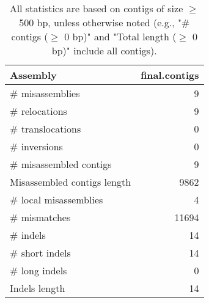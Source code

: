 \documentclass[12pt,a4paper]{article}
\begin{document}
\begin{table}[ht]
\begin{center}
\caption{All statistics are based on contigs of size $\geq$ 500 bp, unless otherwise noted (e.g., "\# contigs ($\geq$ 0 bp)" and "Total length ($\geq$ 0 bp)" include all contigs).}
\begin{tabular}{|l*{1}{|r}|}
\hline
Assembly & final.contigs \\ \hline
\# misassemblies & 9 \\ \hline
\hspace{5mm}\# relocations & 9 \\ \hline
\hspace{5mm}\# translocations & 0 \\ \hline
\hspace{5mm}\# inversions & 0 \\ \hline
\# misassembled contigs & 9 \\ \hline
Misassembled contigs length & 9862 \\ \hline
\# local misassemblies & 4 \\ \hline
\# mismatches & 11694 \\ \hline
\# indels & 14 \\ \hline
\hspace{5mm}\# short indels & 14 \\ \hline
\hspace{5mm}\# long indels & 0 \\ \hline
Indels length & 14 \\ \hline
\end{tabular}
\end{center}
\end{table}
\end{document}
